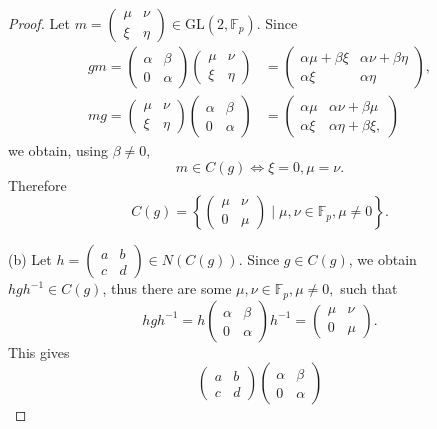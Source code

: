 \documentclass[11pt,a4paper]{article}
\newcommand{\F}{\mathbb{F}}
\begin{document}
{\begin{proof}
Let $m=\begin{pmatrix} \mu & \nu\\ \xi  & \eta \end{pmatrix} \in \mathrm{GL}(2,\F_p)$.
Since 
\begin{align*}
gm = \begin{pmatrix} \alpha & \beta\\ 0 & \alpha \end{pmatrix} \begin{pmatrix} \mu & \nu\\ \xi  & \eta \end{pmatrix}&= 
\begin{pmatrix} \alpha \mu + \beta \xi & \alpha \nu+\beta \eta\\ \alpha \xi & \alpha \eta \end{pmatrix},\\
mg = \begin{pmatrix} \mu & \nu\\ \xi  & \eta \end{pmatrix}\begin{pmatrix} \alpha & \beta\\ 0 & \alpha \end{pmatrix} &= 
\begin{pmatrix} \alpha \mu& \alpha \nu + \beta \mu\\ \alpha \xi & \alpha \eta + \beta \xi, \end{pmatrix}
\end{align*}
we obtain, using $\beta \ne 0$,
$$ m \in C(g) \iff \xi = 0, \mu = \nu.$$
Therefore
$$C(g) = \left\{\begin{pmatrix} \mu & \nu\\ 0 & \mu \end{pmatrix} \mid \mu,\nu \in \F_p, \mu \ne 0\right\}.$$
\item[(b)] Let  $h = \begin{pmatrix} a & b\\ c & d \end{pmatrix} \in N(C(g))$. Since $g \in C(g)$, we obtain $hgh^{-1} \in C(g)$, thus there are some $\mu,\nu \in \F_p, \mu \ne 0,$ such that 
$$hgh^{-1}  = h \begin{pmatrix} \alpha & \beta\\ 0 & \alpha \end{pmatrix} h^{-1} = \begin{pmatrix} \mu & \nu\\ 0 & \mu \end{pmatrix}.$$
This gives
$$ \begin{pmatrix} a & b\\ c & d \end{pmatrix}\begin{pmatrix} \alpha & \beta\\ 0 & \alpha \end{pmatrix}
$$
\end{proof}}
\end{document}
